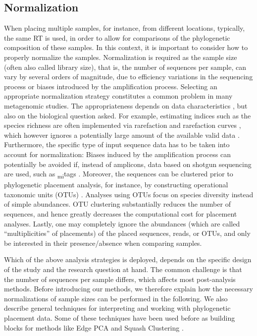 \subsection{Normalization}
\label{ch:Foundations:sec:PhylogeneticPlacementProcessing:sub:Normalization}

When placing multiple samples, for instance, from different locations,
typically, the same \ac{RT} is used, in order to allow for comparisons of the phylogenetic composition of these samples.
In this context, it is important to consider how to properly normalize the samples.
Normalization is required as the sample size (often also called library size),
that is, the number of sequences per sample, can vary by several orders of magnitude,
due to efficiency variations in the sequencing process or biases introduced by the amplification process.
Selecting an appropriate normalization strategy constitutes a common problem in many metagenomic studies.
The appropriateness depends on data characteristics \cite{Weiss2017}, but also on the biological question asked.
For example, estimating indices such as the species richness are often implemented
via rarefaction and rarefaction curves \cite{Gotelli2001},
which however ignores a potentially large amount of the available valid data \cite{McMurdie2014}.
Furthermore, the specific type of input sequence data has to be taken into account for normalization:
Biases induced by the amplification process can potentially be avoided if, instead of amplicons,
data based on shotgun sequencing are used, such as \textsubscript{mi}tags \cite{Logares2014}.
Moreover, the sequences can be clustered prior to phylogenetic placement analysis,
for instance, by constructing operational taxonomic units (OTUs) \cite{Edgar2010,Mahe2014,Mahe2015,Rognes2016}.
Analyses using OTUs focus on species diversity instead of simple abundances.
OTU clustering substantially reduces the number of sequences,
and hence greatly decreases the computational cost for placement analyses.
Lastly, one may completely ignore the abundances (which are called ``multiplicities'' of placements) of the placed
sequences, reads, or OTUs, and only be interested in their presence/absence when comparing samples.

Which of the above analysis strategies is deployed,
depends on the specific design of the study and the research question at hand.
The common challenge is that the number of sequences per sample differs, which affects most post-analysis methods.
Before introducing our methods,
we therefore explain how the necessary normalizations of sample sizes can be performed in the following.
We also describe general techniques for interpreting and working with phylogenetic placement data.
Some of these techniques have been used before as building blocks
for methods like Edge PCA and Squash Clustering \cite{Matsen2011a,Evans2012}. 

